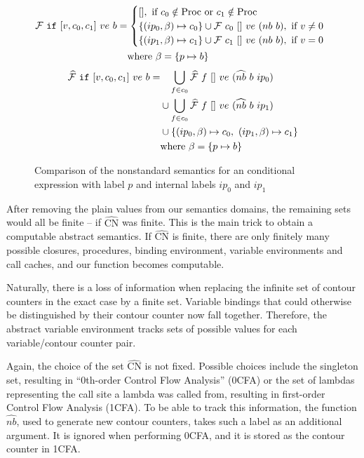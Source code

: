 \documentclass[a4paper,parskip=half,BCOR=8mm,DIV=calc,12pt]{scrbook}
\newcommand{\F}{\mathcal F}
\newcommand{\aF}{\widehat{\mathcal F}}
\begin{document}
\begin{figure}
\begin{framed}
\begin{align*}
\F\ \text{\texttt{if}}\ [v,c_0, c_1]\  ve\ b &=
\begin{cases}
[], \text{ if } c_0 \notin \text{Proc} \text{ or } c_1 \notin \text{Proc} \\
\{ (ip_0,\beta) \mapsto c_0 \} \cup \F\ c_0\ []\ ve\ (nb\ b),\text{ if } v \ne 0 \\
\{ (ip_1,\beta) \mapsto c_1 \} \cup \F\ c_1\ []\ ve\ (nb\ b),\text{ if } v = 0 
\end{cases}\\
&\phantom{\strut=}\text{where } \beta = \{ p \mapsto b \}
\end{align*}
\begin{align*}
\aF\ \text{\texttt{if}}\ [v,c_0, c_1]\  ve\ b &=
\phantom{\cup}\bigcup_{f\in c_0} \aF\ f\ []\ ve\ (\widehat{nb}\ b\ ip_0)\\
&\phantom{\strut=} \cup \bigcup_{f\in c_0} \aF\ f\ []\ ve\ (\widehat{nb}\ b\ ip_1)\\
&\phantom{\strut=} \cup \{ (ip_0, \beta) \mapsto c_0,\ (ip_1, \beta) \mapsto c_1\} \\
&\phantom{\strut=}\text{where } \beta = \{ p \mapsto b \}
\end{align*}
\vspace{-1em}
\end{framed}
\caption{Comparison of the nonstandard semantics for an conditional expression with label $p$ and internal labels $ip_0$ and $ip_1$ }
\label{fig:ifsem}
\end{figure}


After removing the plain values from our semantics domains, the remaining sets would all be finite – if $\widehat{\text{CN}}$ was finite. This is the main trick to obtain a computable abstract semantics. If $\widehat{\text{CN}}$ is finite, there are only finitely many possible closures, procedures, binding environment, variable environments and call caches, and our function becomes computable.

Naturally, there is a loss of information when replacing the infinite set of contour counters in the exact case by a finite set. Variable bindings that could otherwise be distinguished by their contour counter now fall together. Therefore, the abstract variable environment tracks sets of possible values for each variable/contour counter pair.

Again, the choice of the set $\widehat{\text{CN}}$ is not fixed. Possible choices include the singleton set, resulting in “0th-order Control Flow Analysis” (0CFA) or the set of lambdas representing the call site a lambda was called from, resulting in first-order Control Flow Analysis (1CFA). To be able to track this information, the function $\widehat{nb}$, used to generate new contour counters, takes such a label as an additional argument. It is ignored when performing 0CFA, and it is stored as the contour counter in 1CFA.
\end{document}
